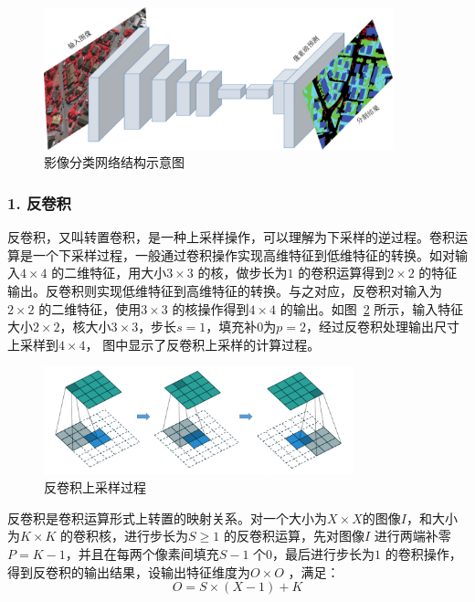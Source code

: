 \begin{figure}[htb]
  \centering
  \includegraphics[width=0.9\textwidth]{figures/FCN}
  \caption{影像分类网络结构示意图}\label{fig:fcn_structure}
\end{figure}

\subsubsection*{1. 反卷积}
\label{subsec:chap02-2-2-1}
反卷积，又叫转置卷积，是一种上采样操作，可以理解为下采样的逆过程。卷积运算是一个下采样过程，一般通过卷积操作实现高维特征到低维特征的转换。如对输入$4\times 4$ 的二维特征，用大小$3\times 3$ 的核，做步长为$1$ 的卷积运算得到$2\times 2$ 的特征输出。反卷积则实现低维特征到高维特征的转换。与之对应，反卷积对输入为$2\times 2$ 的二维特征，使用$3\times 3$ 的核操作得到$4\times 4$ 的输出。如图~\ref{fig:deconv} 所示，输入特征大小$2\times 2$，核大小$3\times 3$，步长$s=1$，填充补0为$p=2$，经过反卷积处理输出尺寸上采样到$4\times 4$， 图中显示了反卷积上采样的计算过程。

\begin{figure}[htb]
  \centering
  \includegraphics[width=0.8\textwidth]{figures/deconv}
  \caption{反卷积上采样过程}\label{fig:deconv}
\end{figure}

反卷积是卷积运算形式上转置的映射关系。对一个大小为$X\times X$的图像$\textit{I}$，和大小为$K\times K$ 的卷积核，进行步长为$S \geq 1$ 的反卷积运算，先对图像$\textit{I}$ 进行两端补零$P=K-1$，并且在每两个像素间填充$S-1$ 个$0$，最后进行步长为$1$ 的卷积操作，得到反卷积的输出结果，设输出特征维度为$O \times O$ ，满足：
\begin{equation}
  \label{eq:2-20}
  O = S \times (X - 1) + K
\end{equation}

